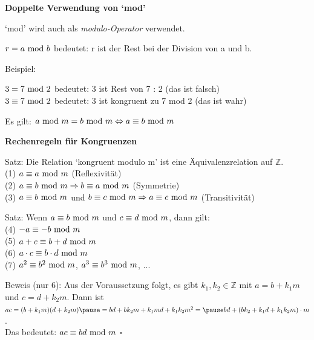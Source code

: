 \begin{frame}[fragile]

\textbf{Doppelte Verwendung von `mod'} 

`mod' wird auch als \textit{modulo-Operator} verwendet. 

$r = a \text{ mod } b$ \quad  bedeutet: r ist der Rest bei der Division von a und b. \pause

Beispiel:

$3 = 7 \text{ mod } 2$ \quad bedeutet: 3 ist Rest von 7 : 2 (das ist falsch) \\ \pause
$3\equiv7\text{ mod }2$ \quad bedeutet: 3 ist kongruent zu 7 mod 2 (das ist wahr) \pause

Es gilt: $a \text{ mod } m = b \text{ mod } m \Leftrightarrow a\equiv b\text{ mod }m$
\end{frame}

\begin{frame}[fragile]

\textbf{Rechenregeln für Kongruenzen} 

Satz: Die Relation `kongruent modulo m' ist eine Äquivalenzrelation auf $\mathbb{Z}$. \\ \pause
(1) $a\equiv a\text{ mod }m$ \quad (Reflexivität)  \\ \pause
(2) $a\equiv b\text{ mod }m  \Rightarrow b\equiv a\text{ mod }m$ \quad (Symmetrie) \\ \pause
(3) $a\equiv b\text{ mod }m$ und $b\equiv c\text{ mod }m  \Rightarrow a\equiv c\text{ mod }m$ \quad (Transitivität) \pause


Satz: Wenn $a\equiv b\text{ mod }m$ und $c\equiv d\text{ mod }m$, dann gilt: \\
(4) $-a\equiv-b\text{ mod }m$ \\  \pause
(5) $a+c\equiv b+d\text{ mod }m$ \\ \pause
(6) $a\cdot c\equiv b\cdot d\text{ mod }m$ \\ \pause
(7) $a^2\equiv b^2\text{ mod }m$,  $a^3\equiv b^3\text{ mod }m$, ... \pause

Beweis (nur 6): Aus der Voraussetzung folgt, es gibt $k_1, k_2 \in \mathbb{Z}$ mit $a = b + k_1m$ und $c = d + k_2m$. \pause
Dann ist $ac = ( b + k_1m)( d + k_2m) \pause= bd + bk_2m+k_1md +k_1k_2m^2 = \pause bd +(bk_2 +k_1d +k_1k_2m) 
\cdot m$. \\ \pause
 Das bedeutet: $ac\equiv bd\text{ mod }m$ \hfill $\square{}$

\end{frame}


